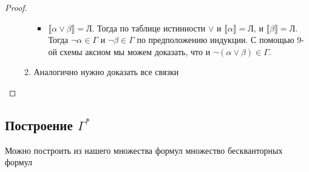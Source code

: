 \begin{proof}
\begin{itemize}
\begin{enumerate}
\begin{itemize}
\item $\llbracket \alpha \vee \beta \rrbracket = \texttt{Л}$. Тогда по таблице истинности $\vee$ и $\llbracket \alpha \rrbracket = \texttt{Л}$, и $\llbracket \beta \rrbracket = \texttt{Л}$. Тогда $\neg \alpha \in \Gamma$ и $\neg \beta \in \Gamma$ по предположению индукции. С помощью 9-ой схемы аксиом мы можем доказать, что и $\neg (\alpha \vee \beta) \in \Gamma$.
\end{itemize}
\item Аналогично нужно доказать все связки
\end{enumerate}
\end{itemize}
\end{proof}
\subsection{Построение \texorpdfstring{$\Gamma ^ *$}{Г*}}
\label{sec-8-5}
\begin{theorem}
Можно построить из нашего множества формул множество бескванторных формул
\end{theorem}
